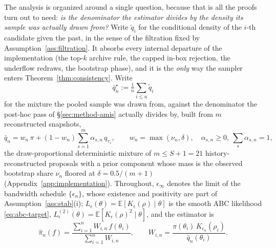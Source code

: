 \documentclass[pdflatex,sn-mathphys-num]{sn-jnl}
\theoremstyle{plain}
\theoremstyle{definition}
\begin{document}
The analysis is organized around a single question, because that is all the proofs turn out to need: \emph{is the denominator the estimator divides by the density its sample was actually drawn from?} Write $\tilde q_i$ for the conditional density of the $i$-th candidate given the past, in the sense of the filtration fixed by Assumption~\ref{ass:filtration}. It absorbs every internal departure of the implementation (the top-$k$ archive rule, the capped in-box rejection, the underflow redraws, the bootstrap phase), and it is the \emph{only} way the sampler enters Theorem~\ref{thm:consistency}. Write
\begin{equation}
\bar q^\star_n:=\tfrac1n\textstyle\sum_{i\le n}\tilde q_i
\label{eq:draw-mixture}
\end{equation}
for the mixture the pooled sample was drawn from, against the denominator the post-hoc pass of \S\ref{sec:method-amis} actually divides by, built from $m$ reconstructed snapshots,
\begin{equation}
\bar q_n = w_n\,\pi + (1-w_n)\sum_{s=1}^{m}\alpha_{s,n}\,q_{\tau_s},
\qquad w_n=\max(\nu_n,\delta),\quad \alpha_{s,n}\ge0,\ \textstyle\sum_s\alpha_{s,n}=1,
\label{eq:snapshot-denominator}
\end{equation}
the draw-proportional deterministic mixture \cite{veach1995,owen2000safe} of $m\le S{+}1=21$ history-reconstructed proposals with a prior component whose mass is the observed bootstrap share $\nu_n$ floored at $\delta=0.5/(m{+}1)$ (Appendix~\ref{app:implementation}). Throughout, $\epsilon_\infty$ denotes the limit of the bandwidth schedule $\{\epsilon_n\}$, whose existence and positivity are part of Assumption~\ref{ass:stab}(i); $L_\epsilon(\theta)=\mathbb{E}[K_\epsilon(\rho)\mid\theta]$ is the smooth ABC likelihood \eqref{eq:abc-target}, $L^{(2)}_\epsilon(\theta)=\mathbb{E}[K_\epsilon(\rho)^2\mid\theta]$, and the estimator is
\begin{equation}
\widehat\pi_n(f) = \frac{\sum_{i=1}^n W_{i,n}\,f(\theta_i)}{\sum_{i=1}^n W_{i,n}},
\qquad
W_{i,n} = \frac{\pi(\theta_i)\,K_{\epsilon_n}(\rho_i)}{\bar q_n(\theta_i)}.
\label{eq:posterior-estimator}
\end{equation}
\end{document}
